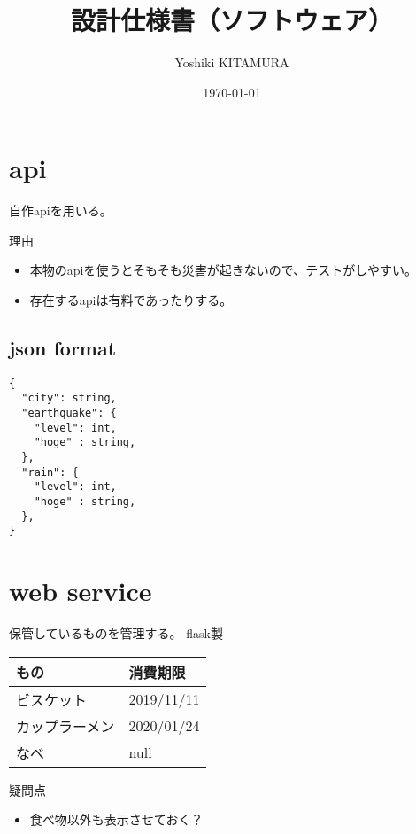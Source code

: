 \documentclass[11pt]{article}
\author{Yoshiki KITAMURA}
\date{\today}
\title{設計仕様書（ソフトウェア）}
\begin{document}
\maketitle
\tableofcontents


\section{api}
\label{sec:orgef6202d}
自作apiを用いる。

理由
\begin{itemize}
\item 本物のapiを使うとそもそも災害が起きないので、テストがしやすい。
\item 存在するapiは有料であったりする。
\end{itemize}

\subsection{json format}
\label{sec:org0569408}
\begin{verbatim}
{
  "city": string,
  "earthquake": {
    "level": int,
    "hoge" : string,
  },
  "rain": {
    "level": int,
    "hoge" : string,
  },
}
\end{verbatim}

\section{web service}
\label{sec:org1e95792}
保管しているものを管理する。
flask製

\begin{center}
\begin{tabular}{ll}
もの & 消費期限\\
\hline
ビスケット & 2019/11/11\\
カップラーメン & 2020/01/24\\
なべ & null\\
\end{tabular}
\end{center}

疑問点
\begin{itemize}
\item 食べ物以外も表示させておく？
\end{itemize}
\end{document}
